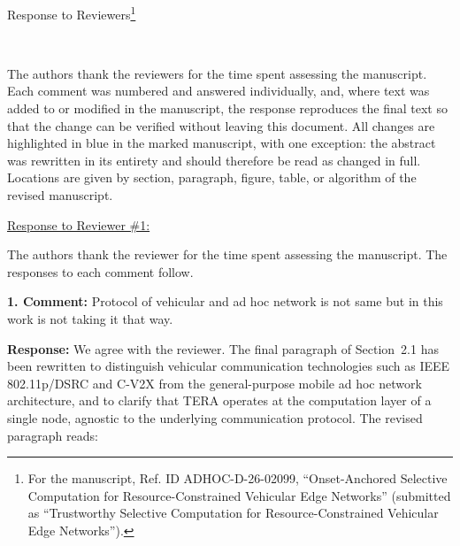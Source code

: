 \documentclass[1p,12pt,authoryear]{elsarticle}
\begin{document}
\newpage

\makeatletter
\def\@xfootnote[#1]{%
  \protected@xdef\@thefnmark{#1}%
  \@footnotemark\@footnotetext}
\makeatother

\begin{center}
\huge Response to Reviewers\footnote[*]{For the manuscript, Ref. ID ADHOC-D-26-02099, ``Onset-Anchored Selective Computation for Resource-Constrained Vehicular Edge Networks'' (submitted as ``Trustworthy Selective Computation for Resource-Constrained Vehicular Edge Networks'').}
\end{center}

~

\noindent The authors thank the reviewers for the time spent assessing the manuscript. Each comment was numbered and answered individually, and, where text was added to or modified in the manuscript, the response reproduces the final text so that the change can be verified without leaving this document. All changes are highlighted in blue in the marked manuscript, with one exception: the abstract was rewritten in its entirety and should therefore be read as changed in full. Locations are given by section, paragraph, figure, table, or algorithm of the revised manuscript.

\newpage


\begin{large}
\noindent \underline{Response to Reviewer \#1:}
\end{large}

\vspace{10pt}

\noindent The authors thank the reviewer for the time spent assessing the manuscript. The responses to each comment follow.

\vspace{0.5cm}
\noindent \textbf{1. Comment:} Protocol of vehicular and ad hoc network is not same but in this work is not taking it that way.

\vspace{2mm}
\noindent \textbf{Response:} We agree with the reviewer. The final paragraph of Section~2.1 has been rewritten to distinguish vehicular communication technologies such as IEEE 802.11p/DSRC and C-V2X from the general-purpose mobile ad hoc network architecture, and to clarify that TERA operates at the computation layer of a single node, agnostic to the underlying communication protocol. The revised paragraph reads:
\end{document}
